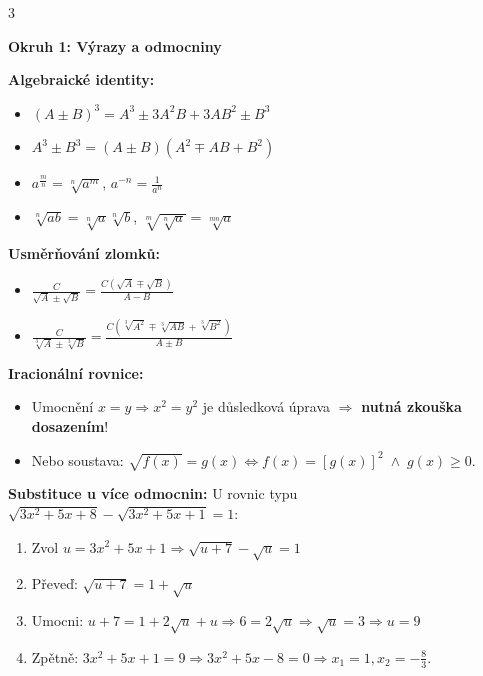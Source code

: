 \documentclass[9pt,a4paper]{article}
\begin{document}
\begin{tcolorbox}[secbox,title=OKRUHY 1--3: ALGEBRAICKÉ VÝRAZY, SOUSTAVY ROVNIC A KVADRATICKÉ ROVNICE]
\begin{multicols}{3}

\textbf{\large Okruh 1: Výrazy a odmocniny}
\vspace{1mm}

\textbf{Algebraické identity:}
\begin{itemize}
  \item $(A \pm B)^3 = A^3 \pm 3A^2B + 3AB^2 \pm B^3$
  \item $A^3 \pm B^3 = (A \pm B)(A^2 \mp AB + B^2)$
  \item $a^{\frac{m}{n}} = \sqrt[n]{a^m}$, \quad $a^{-n} = \frac{1}{a^n}$
  \item $\sqrt[n]{ab} = \sqrt[n]{a} \sqrt[n]{b}$, \quad $\sqrt[m]{\sqrt[n]{a}} = \sqrt[mn]{a}$
\end{itemize}
\textbf{Usměrňování zlomků:}
\begin{itemize}
  \item $\frac{C}{\sqrt{A} \pm \sqrt{B}} = \frac{C(\sqrt{A} \mp \sqrt{B})}{A - B}$
  \item $\frac{C}{\sqrt[3]{A} \pm \sqrt[3]{B}} = \frac{C(\sqrt[3]{A^2} \mp \sqrt[3]{AB} + \sqrt[3]{B^2})}{A \pm B}$
\end{itemize}
\textbf{Iracionální rovnice:}
\begin{itemize}
  \item Umocnění $x = y \Rightarrow x^2 = y^2$ je důsledková úprava $\Rightarrow$ \textbf{nutná zkouška dosazením}!
  \item Nebo soustava: $\sqrt{f(x)} = g(x) \Leftrightarrow f(x) = [g(x)]^2 \;\land\; g(x) \ge 0$.
\end{itemize}
\textbf{Substituce u více odmocnin:}
U rovnic typu $\sqrt{3x^2+5x+8} - \sqrt{3x^2+5x+1} = 1$:
\begin{enumerate}
  \item Zvol $u = 3x^2+5x+1 \Rightarrow \sqrt{u+7} - \sqrt{u} = 1$
  \item Převeď: $\sqrt{u+7} = 1 + \sqrt{u}$
  \item Umocni: $u+7 = 1 + 2\sqrt{u} + u \Rightarrow 6 = 2\sqrt{u} \Rightarrow \sqrt{u} = 3 \Rightarrow u = 9$
  \item Zpětně: $3x^2+5x+1 = 9 \Rightarrow 3x^2+5x-8 = 0 \Rightarrow x_1 = 1, x_2 = -\frac{8}{3}$.
\end{enumerate}


\end{multicols}
\end{tcolorbox}
\end{document}
